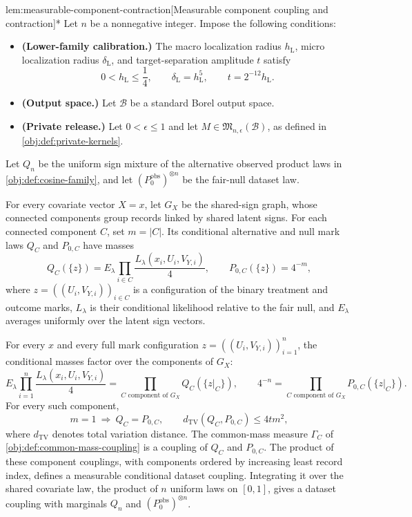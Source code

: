 \documentclass[11pt]{article}
\begin{document}
\begin{lemmav}{lem:measurable-component-contraction}[Measurable component coupling and contraction]*
Let \(n\) be a nonnegative integer. Impose the following conditions:
\begin{itemize}
\item \textbf{(Lower-family calibration.)} The macro localization radius \(h_{\mathrm L}\), micro localization radius \(\delta_{\mathrm L}\), and target-separation amplitude \(t\) satisfy
\[
0<h_{\mathrm L}\le\frac14,
\qquad
\delta_{\mathrm L}=h_{\mathrm L}^{5},
\qquad
t=2^{-12}h_{\mathrm L}.
\]
\item \textbf{(Output space.)} Let \(\mathcal B\) be a standard Borel output space.
\item \textbf{(Private release.)} Let \(0<\epsilon\le1\) and let \(M\in\mathfrak M_{n,\epsilon}(\mathcal B)\), as defined in \cref{obj:def:private-kernels}.
\end{itemize}
Let \(Q_n\) be the uniform sign mixture of the alternative observed product laws in \cref{obj:def:cosine-family}, and let \((P_0^{\mathrm{obs}})^{\otimes n}\) be the fair-null dataset law.

For every covariate vector \(X=x\), let \(G_X\) be the shared-sign graph, whose connected components group records linked by shared latent signs. For each connected component \(C\), set \(m=|C|\). Its conditional alternative and null mark laws \(Q_C\) and \(P_{0,C}\) have masses
\[
Q_C(\{z\})
 = E_\lambda\prod_{i\in C}
   \frac{L_\lambda(x_i,U_i,V_{Y,i})}{4},
\qquad
P_{0,C}(\{z\})=4^{-m},
\]
where \(z=((U_i,V_{Y,i}))_{i\in C}\) is a configuration of the binary treatment and outcome marks, \(L_\lambda\) is their conditional likelihood relative to the fair null, and \(E_\lambda\) averages uniformly over the latent sign vectors.

For every \(x\) and every full mark configuration \(z=((U_i,V_{Y,i}))_{i=1}^n\), the conditional masses factor over the components of \(G_X\):
\[
E_\lambda\prod_{i=1}^n
  \frac{L_\lambda(x_i,U_i,V_{Y,i})}{4}
 = \prod_{C\text{ component of }G_X} Q_C(\{z|_C\}),
\qquad
4^{-n}
 = \prod_{C\text{ component of }G_X} P_{0,C}(\{z|_C\}).
\]
For every such component,
\[
m=1\ \Longrightarrow\ Q_C=P_{0,C},
\qquad
d_{\mathrm{TV}}(Q_C,P_{0,C})\le4tm^2,
\]
where \(d_{\mathrm{TV}}\) denotes total variation distance. The common-mass measure \(\Gamma_C\) of \cref{obj:def:common-mass-coupling} is a coupling of \(Q_C\) and \(P_{0,C}\). The product of these component couplings, with components ordered by increasing least record index, defines a measurable conditional dataset coupling. Integrating it over the shared covariate law, the product of \(n\) uniform laws on \([0,1]\), gives a dataset coupling with marginals \(Q_n\) and \((P_0^{\mathrm{obs}})^{\otimes n}\).


\end{lemmav}
\end{document}

